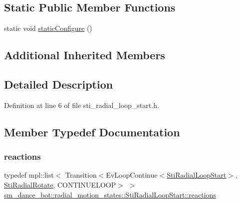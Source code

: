 \subsection*{Static Public Member Functions}
\begin{DoxyCompactItemize}
\item 
static void \hyperlink{structsm__dance__bot_1_1radial__motion__states_1_1StiRadialLoopStart_a5ff99328ae5482be3b666166f9ca769b}{static\+Configure} ()
\end{DoxyCompactItemize}
\subsection*{Additional Inherited Members}


\subsection{Detailed Description}


Definition at line 6 of file sti\+\_\+radial\+\_\+loop\+\_\+start.\+h.



\subsection{Member Typedef Documentation}
\mbox{\label{structsm__dance__bot_1_1radial__motion__states_1_1StiRadialLoopStart_a817d8c91080ccf4ff0f387455d26f94c}} 
\subsubsection{\texorpdfstring{reactions}{reactions}}
{\footnotesize\ttfamily typedef mpl\+::list$<$ Transition$<$Ev\+Loop\+Continue$<$\hyperlink{structsm__dance__bot_1_1radial__motion__states_1_1StiRadialLoopStart}{Sti\+Radial\+Loop\+Start}$>$, \hyperlink{structsm__dance__bot_1_1radial__motion__states_1_1StiRadialRotate}{Sti\+Radial\+Rotate}, C\+O\+N\+T\+I\+N\+U\+E\+L\+O\+OP$>$ $>$ \hyperlink{structsm__dance__bot_1_1radial__motion__states_1_1StiRadialLoopStart_a817d8c91080ccf4ff0f387455d26f94c}{sm\+\_\+dance\+\_\+bot\+::radial\+\_\+motion\+\_\+states\+::\+Sti\+Radial\+Loop\+Start\+::reactions}}



